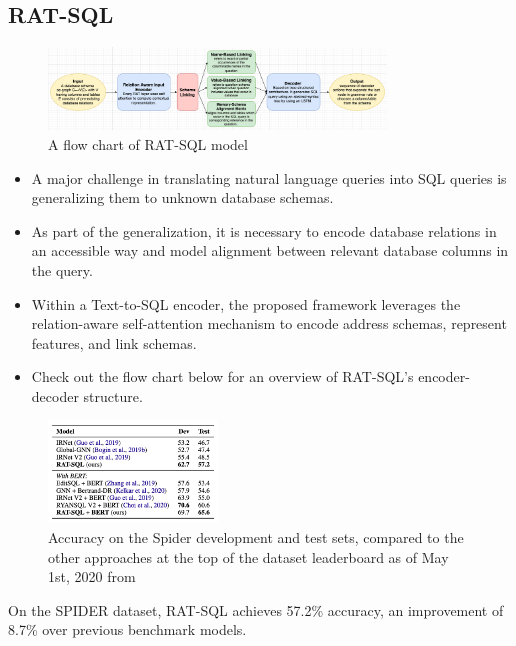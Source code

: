 \subsection{RAT-SQL}

\begin{figure}[htb]
    \centering
    \includegraphics[width=0.8\textwidth]{pics/RAT-SQL/flow.png}
    \caption{A flow chart of RAT-SQL model}
    \label{fig:RAT-SQL-flow}
\end{figure}

\begin{itemize}
    \item A major challenge in translating natural language queries into SQL queries is generalizing them to unknown database schemas.
    \item As part of the generalization, it is necessary to encode database relations in an accessible way and model alignment between relevant database columns in the query.
    \item Within a Text-to-SQL encoder, the proposed framework leverages the relation-aware self-attention mechanism to encode address schemas, represent features, and link schemas.
    \item Check out the flow chart below for an overview of RAT-SQL's encoder-decoder structure.
\end{itemize}

\begin{figure}[htb]
    \centering
    \includegraphics[width=0.4\textwidth]{pics/RAT-SQL/Accuracy.png}
    \caption{Accuracy on the Spider development and test sets, compared to the other approaches at the top of the dataset leaderboard as of May 1st, 2020 from \cite{wang_rat-sql_2021}}
    \label{fig:RAT-SQL-Accuracy}
\end{figure}

On the SPIDER dataset, RAT-SQL achieves 57.2\% accuracy, an improvement of 8.7\% over previous benchmark models.

